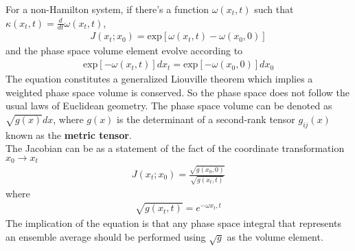 \documentclass{article}
\begin{document}
For a non-Hamilton system, if there's a function $\omega(x_t,t)$ such that $\kappa(x_t,t)=\frac{d}{dt}\omega(x_t,t)$,
\begin{align}
J(x_t;x_0)=\text{exp}[\omega(x_t,t)-\omega(x_0,0)]
\end{align}
and the phase space volume element evolve according to
\begin{align}
\text{exp}[-\omega(x_t,t)]dx_t=\text{exp}[-\omega(x_0,0)]dx_0
\end{align}
The equation constitutes a generalized Liouville theorem which implies a weighted phase space volume is conserved. So the phase space does not follow the usual laws of Euclidean geometry. The phase space volume can be denoted as $\sqrt{g(x)}dx$, where $g(x)$ is the determinant of a second-rank tensor $g_{ij}(x)$ known as the \textbf{metric tensor}.\\
The Jacobian can be as a statement of the fact of the coordinate transformation $x_0\rightarrow x_t$
\begin{align}
J(x_t;x_0)=\frac{\sqrt{g(x_0,0)}}{\sqrt{g(x_t,t)}}
\end{align}
where
\begin{align}
\sqrt{g(x_t,t)}=e^{-\omega{x_t,t}}
\end{align}
The implication of the equation is that any phase space integral that represents an ensemble average should be performed using $\sqrt{g}$ as the volume element.
\end{document}
